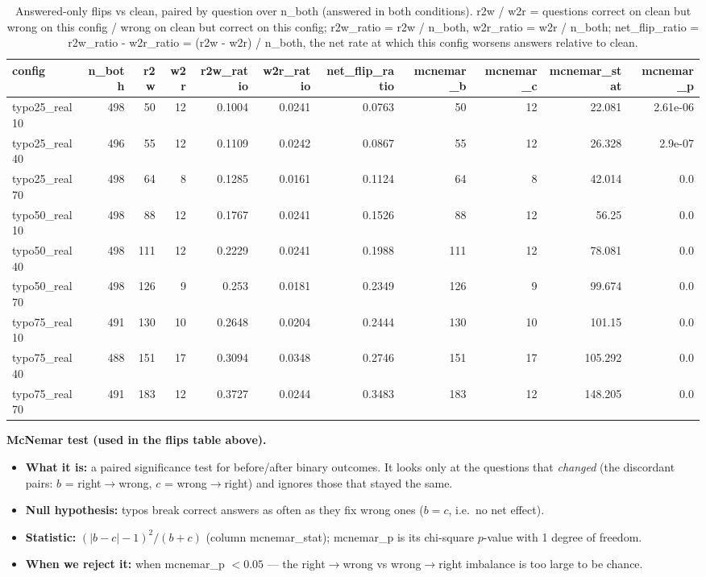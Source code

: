 \documentclass[11pt]{article}
\begin{document}
\begin{table}[H]
\centering
\caption{Answered-only flips vs clean, paired by question over n\_both (answered in both conditions). r2w / w2r = questions correct on clean but wrong on this config / wrong on clean but correct on this config; r2w\_ratio = r2w / n\_both, w2r\_ratio = w2r / n\_both; net\_flip\_ratio = r2w\_ratio - w2r\_ratio = (r2w - w2r) / n\_both, the net rate at which this config worsens answers relative to clean.}
\small
\begin{adjustbox}{max width=\textwidth}
\begin{tabular}{lrrrrrrrrrr}
\toprule
\textbf{config} & \textbf{n\_both} & \textbf{r2w} & \textbf{w2r} & \textbf{r2w\_ratio} & \textbf{w2r\_ratio} & \textbf{net\_flip\_ratio} & \textbf{mcnemar\_b} & \textbf{mcnemar\_c} & \textbf{mcnemar\_stat} & \textbf{mcnemar\_p} \\
\midrule
typo25\_real10 & 498 & 50 & 12 & 0.1004 & 0.0241 & 0.0763 & 50 & 12 & 22.081 & 2.61e-06 \\
typo25\_real40 & 496 & 55 & 12 & 0.1109 & 0.0242 & 0.0867 & 55 & 12 & 26.328 & 2.9e-07 \\
typo25\_real70 & 498 & 64 & 8 & 0.1285 & 0.0161 & 0.1124 & 64 & 8 & 42.014 & 0.0 \\
typo50\_real10 & 498 & 88 & 12 & 0.1767 & 0.0241 & 0.1526 & 88 & 12 & 56.25 & 0.0 \\
typo50\_real40 & 498 & 111 & 12 & 0.2229 & 0.0241 & 0.1988 & 111 & 12 & 78.081 & 0.0 \\
typo50\_real70 & 498 & 126 & 9 & 0.253 & 0.0181 & 0.2349 & 126 & 9 & 99.674 & 0.0 \\
typo75\_real10 & 491 & 130 & 10 & 0.2648 & 0.0204 & 0.2444 & 130 & 10 & 101.15 & 0.0 \\
typo75\_real40 & 488 & 151 & 17 & 0.3094 & 0.0348 & 0.2746 & 151 & 17 & 105.292 & 0.0 \\
typo75\_real70 & 491 & 183 & 12 & 0.3727 & 0.0244 & 0.3483 & 183 & 12 & 148.205 & 0.0 \\
\bottomrule
\end{tabular}
\end{adjustbox}
\end{table}

\medskip
\noindent\textbf{McNemar test (used in the flips table above).}
\begin{itemize}\setlength{\itemsep}{1pt}
  \item \textbf{What it is:} a paired significance test for before/after binary
  outcomes. It looks only at the questions that \emph{changed} (the discordant pairs:
  $b$ = right$\to$wrong, $c$ = wrong$\to$right) and ignores those that stayed the same.
  \item \textbf{Null hypothesis:} typos break correct answers as often as they fix
  wrong ones ($b = c$, i.e.\ no net effect).
  \item \textbf{Statistic:} $(|b - c| - 1)^2 / (b + c)$ (column mcnemar\_stat);
  mcnemar\_p is its chi-square $p$-value with 1 degree of freedom.
  \item \textbf{When we reject it:} when mcnemar\_p $< 0.05$ --- the
  right$\to$wrong vs wrong$\to$right imbalance is too large to be chance.
\end{itemize}
\end{document}
